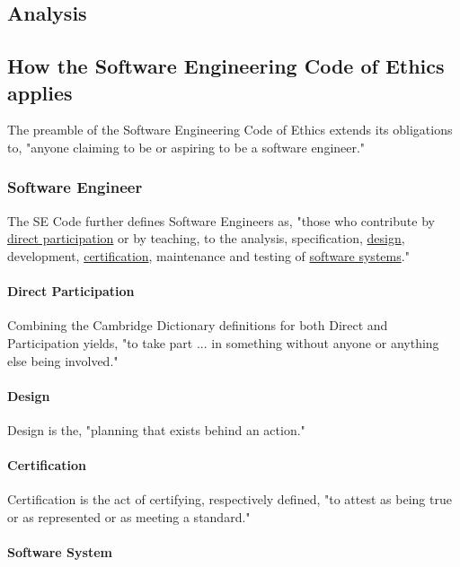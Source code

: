 \documentclass[12pt]{article}
\begin{document}
\begin{multicols}{2}
\section{Analysis}

\subsection{How the Software Engineering Code of Ethics applies}

The preamble of the Software Engineering Code of Ethics extends its obligations to, "anyone claiming to be or aspiring to be a software engineer."\cite{softwareEngineeringCodeOfEthics}

\subsubsection{Software Engineer}

The SE Code further defines Software Engineers as, "those who contribute by \underline{direct participation} or by teaching, to the analysis, specification, \underline{design}, development, \underline{certification}, maintenance and testing of \underline{software systems}."

\paragraph{Direct Participation}

Combining the Cambridge Dictionary definitions for both Direct and Participation yields, "to take part ... in something without anyone or anything else being involved."\cite{participationDefinition}\cite{directDefinition}

\paragraph{Design}
Design is the, "planning that exists behind an action."\cite{designDefinition}

\paragraph{Certification}
Certification is the act of certifying, respectively defined, "to attest as being true or as represented or as meeting a standard."\cite{certifyingDefinition}

\paragraph{Software System}


\end{multicols}
\end{document}
